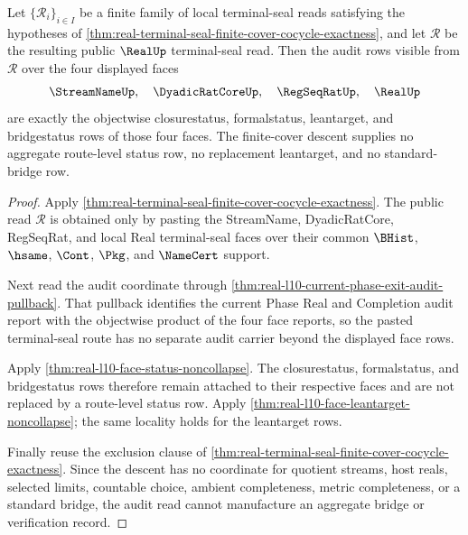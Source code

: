 \begin{theorem}
\label{thm:real-terminal-seal-audit-noncollapse}
Let $\{\mathcal R_i\}_{i\in I}$ be a finite family of local terminal-seal
reads satisfying the hypotheses of
\autoref{thm:real-terminal-seal-finite-cover-cocycle-exactness}, and let
$\mathcal R$ be the resulting public $\RealUp$ terminal-seal read. Then the
audit rows visible from $\mathcal R$ over the four displayed faces
$$
\StreamNameUp,\quad \DyadicRatCoreUp,\quad \RegSeqRatUp,\quad \RealUp
$$
are exactly the objectwise closurestatus, formalstatus, leantarget, and
bridgestatus rows of those four faces. The finite-cover descent supplies no
aggregate route-level status row, no replacement leantarget, and no
standard-bridge row.
\end{theorem}
\begin{proof}
Apply \autoref{thm:real-terminal-seal-finite-cover-cocycle-exactness}. The
public read $\mathcal R$ is obtained only by pasting the StreamName,
DyadicRatCore, RegSeqRat, and local Real terminal-seal faces over their common
$\BHist$, $\hsame$, $\Cont$, $\Pkg$, and $\NameCert$ support.

Next read the audit coordinate through
\autoref{thm:real-l10-current-phase-exit-audit-pullback}. That pullback
identifies the current Phase Real and Completion audit report with the
objectwise product of the four face reports, so the pasted terminal-seal route
has no separate audit carrier beyond the displayed face rows.

Apply \autoref{thm:real-l10-face-status-noncollapse}. The closurestatus,
formalstatus, and bridgestatus rows therefore remain attached to their
respective faces and are not replaced by a route-level status row. Apply
\autoref{thm:real-l10-face-leantarget-noncollapse}; the same locality holds
for the leantarget rows.

Finally reuse the exclusion clause of
\autoref{thm:real-terminal-seal-finite-cover-cocycle-exactness}. Since the
descent has no coordinate for quotient streams, host reals, selected limits,
countable choice, ambient completeness, metric completeness, or a standard
bridge, the audit read cannot manufacture an aggregate bridge or verification
record.
\end{proof}

